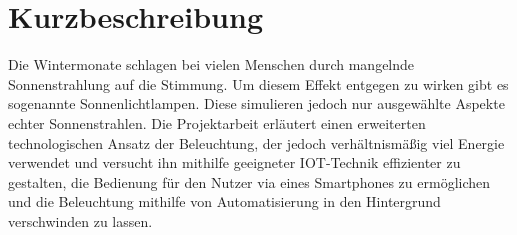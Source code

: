 \chapter*{Kurzbeschreibung}
Die Wintermonate schlagen bei vielen Menschen durch mangelnde Sonnenstrahlung auf die Stimmung. Um diesem Effekt entgegen zu wirken gibt es sogenannte \glqq Sonnenlichtlampen\grqq{}. Diese simulieren jedoch nur ausgewählte Aspekte echter Sonnenstrahlen. Die Projektarbeit erläutert einen erweiterten technologischen Ansatz der Beleuchtung, der jedoch verhältnismäßig viel Energie verwendet und versucht ihn mithilfe geeigneter IOT-Technik effizienter zu gestalten, die Bedienung für den Nutzer via eines Smartphones zu ermöglichen und die Beleuchtung mithilfe von Automatisierung in den Hintergrund verschwinden zu lassen.